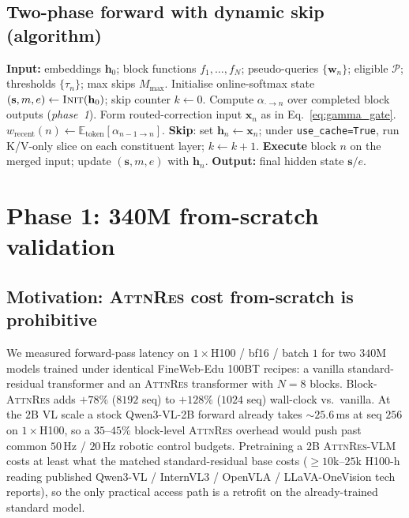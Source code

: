 \documentclass{article}
\newcommand{\attnres}{\textsc{AttnRes}}
\newcommand{\reskip}{\textsc{ReSkip}}
\newcommand{\E}{\mathbb{E}}
\begin{document}
\subsection{Two-phase forward with dynamic skip (algorithm)}
\label{app:algorithm}
\begin{algorithm}[h]
\caption{Two-phase \attnres{} forward with dynamic \reskip{}.}
\label{alg:two_phase}
\begin{algorithmic}[1]
\STATE \textbf{Input:} embeddings $\mathbf{h}_0$; block functions $f_1,\dots,f_N$; pseudo-queries $\{\mathbf{w}_n\}$; eligible $\mathcal{P}$; thresholds $\{\tau_n\}$; max skips $M_{\max}$.
\STATE Initialise online-softmax state $(\mathbf{s}, m, e) \gets \textsc{Init}(\mathbf{h}_0)$; skip counter $k \gets 0$.
  \STATE Compute $\alpha_{\cdot \to n}$ over completed block outputs (\emph{phase~1}).
  \STATE Form routed-correction input $\mathbf{x}_n$ as in Eq.~\ref{eq:gamma_gate}.
  \STATE $w_{\text{recent}}(n) \gets \E_{\text{token}}[\alpha_{n-1\to n}]$.
    \STATE \textbf{Skip}: set $\mathbf{h}_n \gets \mathbf{x}_n$; under \texttt{use\_cache=True}, run K/V-only slice on each constituent layer; $k \gets k+1$.
  \ELSE
    \STATE \textbf{Execute} block $n$ on the merged input; update $(\mathbf{s},m,e)$ with $\mathbf{h}_n$.
  \ENDIF
\ENDFOR
\STATE \textbf{Output:} final hidden state $\mathbf{s}/e$.
\end{algorithmic}
\end{algorithm}

\section{Phase 1: 340M from-scratch validation}
\label{app:phase1_section}

\subsection{Motivation: \attnres{} cost from-scratch is prohibitive}
\label{app:motivation}
We measured forward-pass latency on $1{\times}$H100 / bf16 / batch $1$ for two $340$M models trained under identical FineWeb-Edu 100BT recipes: a vanilla standard-residual transformer and an \attnres{} transformer with $N{=}8$ blocks. Block-\attnres{} adds $+78\%$ ($8192$ seq) to $+128\%$ ($1024$ seq) wall-clock vs.\ vanilla. At the $2$B VL scale a stock Qwen3-VL-2B forward already takes $\sim$$25.6$\,ms at seq $256$ on $1{\times}$H100, so a $35$--$45\%$ block-level \attnres{} overhead would push past common $50$\,Hz / $20$\,Hz robotic control budgets. Pretraining a $2$B \attnres{}-VLM costs at least what the matched standard-residual base costs ($\geq 10$k--$25$k H100-h reading published Qwen3-VL / InternVL3 / OpenVLA / LLaVA-OneVision tech reports), so the only practical access path is a retrofit on the already-trained standard model.
\end{document}
